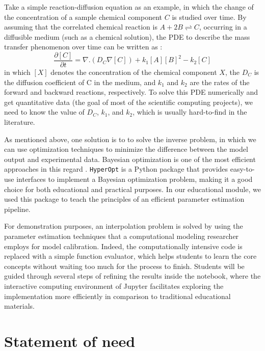 Take a simple reaction-diffusion equation as an example, in which the change of the concentration of a sample chemical component $C$ is studied over time. By assuming that the correlated chemical reaction is $A + 2B \rightleftharpoons C$, occurring in a diffusible medium (such as a chemical solution), the \gls{PDE} to describe the mass transfer phenomenon over time can be written as \cite{Grindrod1996}:
\begin{equation}
\frac{\partial [C]}{\partial t} = \nabla . \left( D_C \nabla [C] \right) + k_1 [A][B]^2 - k_2 [C]
\end{equation}
in which $[X]$ denotes the concentration of the chemical component $X$, the $D_C$ is the diffusion coefficient of C in the medium, and $k_1$ and $k_2$ are the rates of the forward and backward reactions, respectively. To solve this \gls{PDE} numerically and get quantitative data (the goal of most of the scientific computing projects), we need to know the value of $D_C$, $k_1$, and $k_2$, which is usually hard-to-find in the literature.

As mentioned above, one solution is to to solve the inverse problem, in which we can use optimization techniques to minimize the difference between the model output and experimental data. Bayesian optimization is one of the most efficient approaches in this regard \cite{Mockus1989}. \texttt{HyperOpt} \cite{Bergstra2013} is a Python package that provides easy-to-use interfaces to implement a Bayesian optimization problem, making it a good choice for both educational and practical purposes. In our educational module, we used this package to teach the principles of an efficient parameter estimation pipeline.

For demonstration purposes, an interpolation problem is solved by using the parameter estimation techniques that a computational modeling researcher employs for model calibration. Indeed, the computationally intensive code is replaced with a simple function evaluator, which helps students to learn the core concepts without waiting too much for the process to finish. Students will be guided through several steps of refining the results inside the notebook, where the interactive computing environment of Jupyter facilitates exploring the implementation more efficiently in comparison to traditional educational materials.

\section{Statement of need}

